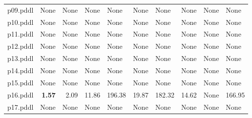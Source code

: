 \documentclass{article}
\begin{document}
\begin{tabular}{@{}lrrrrrrrrr@{}}
p09.pddl & \multicolumn{1}{|l|}{None} & \multicolumn{1}{|l|}{None} & \multicolumn{1}{|l|}{None} & \multicolumn{1}{|l|}{None} & \multicolumn{1}{|l|}{None} & \multicolumn{1}{|l|}{None} & \multicolumn{1}{|l|}{None} & \multicolumn{1}{|l|}{None} & \multicolumn{1}{|l|}{None} \\
p10.pddl & \multicolumn{1}{|l|}{None} & \multicolumn{1}{|l|}{None} & \multicolumn{1}{|l|}{None} & \multicolumn{1}{|l|}{None} & \multicolumn{1}{|l|}{None} & \multicolumn{1}{|l|}{None} & \multicolumn{1}{|l|}{None} & \multicolumn{1}{|l|}{None} & \multicolumn{1}{|l|}{None} \\
p11.pddl & \multicolumn{1}{|l|}{None} & \multicolumn{1}{|l|}{None} & \multicolumn{1}{|l|}{None} & \multicolumn{1}{|l|}{None} & \multicolumn{1}{|l|}{None} & \multicolumn{1}{|l|}{None} & \multicolumn{1}{|l|}{None} & \multicolumn{1}{|l|}{None} & \multicolumn{1}{|l|}{None} \\
p12.pddl & \multicolumn{1}{|l|}{None} & \multicolumn{1}{|l|}{None} & \multicolumn{1}{|l|}{None} & \multicolumn{1}{|l|}{None} & \multicolumn{1}{|l|}{None} & \multicolumn{1}{|l|}{None} & \multicolumn{1}{|l|}{None} & \multicolumn{1}{|l|}{None} & \multicolumn{1}{|l|}{None} \\
p13.pddl & \multicolumn{1}{|l|}{None} & \multicolumn{1}{|l|}{None} & \multicolumn{1}{|l|}{None} & \multicolumn{1}{|l|}{None} & \multicolumn{1}{|l|}{None} & \multicolumn{1}{|l|}{None} & \multicolumn{1}{|l|}{None} & \multicolumn{1}{|l|}{None} & \multicolumn{1}{|l|}{None} \\
p14.pddl & \multicolumn{1}{|l|}{None} & \multicolumn{1}{|l|}{None} & \multicolumn{1}{|l|}{None} & \multicolumn{1}{|l|}{None} & \multicolumn{1}{|l|}{None} & \multicolumn{1}{|l|}{None} & \multicolumn{1}{|l|}{None} & \multicolumn{1}{|l|}{None} & \multicolumn{1}{|l|}{None} \\
p15.pddl & \multicolumn{1}{|l|}{None} & \multicolumn{1}{|l|}{None} & \multicolumn{1}{|l|}{None} & \multicolumn{1}{|l|}{None} & \multicolumn{1}{|l|}{None} & \multicolumn{1}{|l|}{None} & \multicolumn{1}{|l|}{None} & \multicolumn{1}{|l|}{None} & \multicolumn{1}{|l|}{None} \\
p16.pddl & \textbf{1.57} & 2.09 & 11.86 & 196.38 & 19.87 & 182.32 & 14.62 & \multicolumn{1}{|l|}{None} & 166.95 \\
p17.pddl & \multicolumn{1}{|l|}{None} & \multicolumn{1}{|l|}{None} & \multicolumn{1}{|l|}{None} & \multicolumn{1}{|l|}{None} & \multicolumn{1}{|l|}{None} & \multicolumn{1}{|l|}{None} & \multicolumn{1}{|l|}{None} & \multicolumn{1}{|l|}{None} & \multicolumn{1}{|l|}{None} \\

\end{tabular}
\end{document}
